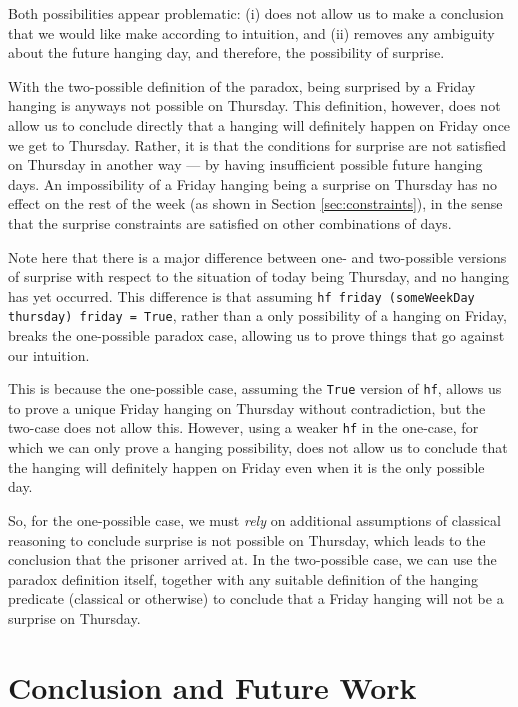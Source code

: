 \documentclass[runningheads]{llncs}
\begin{document}
Both possibilities appear problematic: (i) does not allow us to make
a conclusion that we would like make according to intuition,
and (ii) removes any ambiguity
about the future hanging day, and therefore, the possibility of surprise.

With the two-possible definition of the paradox, being surprised by a Friday hanging is anyways
not possible on Thursday.
This definition, however, does not allow us to conclude directly that a hanging will
definitely happen on Friday once we get to Thursday. Rather, it is that the
conditions for surprise are not satisfied on Thursday in another way --- by having insufficient
possible future hanging days. An impossibility of a Friday hanging being a surprise on Thursday has no effect
on the rest of the week (as shown in Section \ref{sec:constraints}), in the sense that
the surprise constraints are satisfied on other combinations of days.

Note here that there is a major difference
between one- and two-possible versions of surprise with respect
to the situation of today being Thursday, and no hanging has yet occurred.
This difference is that assuming
{\tt hf friday (someWeekDay thursday) friday = True}, rather than a only
possibility of a hanging on Friday, breaks the one-possible paradox case,
allowing us to prove things that go against our intuition.

This is because the one-possible case, assuming the {\tt True} version of {\tt hf},
allows us to prove a unique Friday hanging on Thursday without contradiction, but
the two-case does not allow this. However, using a weaker {\tt hf} in the one-case, for which
we can only prove a hanging possibility, does not allow us to conclude that
the hanging will definitely happen on Friday even when it is the only possible day.

So, for the one-possible case, we must \emph{rely} on additional assumptions of
classical reasoning to conclude surprise is not possible on Thursday,
which leads to the conclusion that the prisoner arrived at.
In the two-possible case, we can use the paradox definition itself, together with
any suitable definition of the hanging predicate (classical or otherwise) to conclude that a Friday
hanging will not be a surprise on Thursday.

\section{Conclusion and Future Work}
\end{document}
